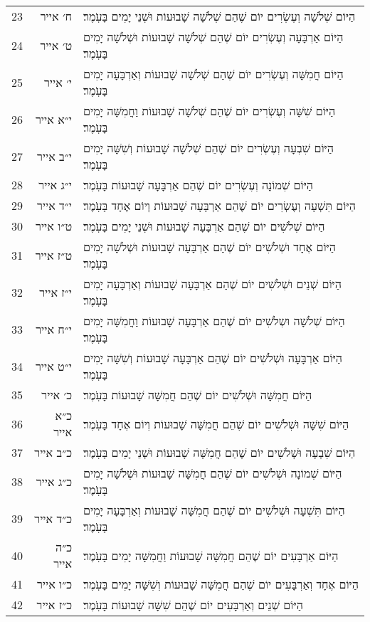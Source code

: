 \documentclass[twoside, openany, parskip=half, 11pt]{book}
\begin{document}
\begin{scriptsize}
\begin{longtable}{ l | r | p{} }
23 & ח׳ אייר & הַיּוֹם שְׁלֹשָׁה וְעֶשְׂרִים יוֹם שֶׁהֵם שְׁלֹשָׁה שָׁבוּעוֹת וּשְׁנֵי יָמִים בָּעֹֽמֶר׃ \\
24 & ט׳ אייר & הַיּוֹם אַרְבָּעָה וְעֶשְׂרִים יוֹם שֶׁהֵם שְׁלֹשָׁה שָׁבוּעוֹת וּשְׁלֹשָׁה יָמִים בָּעֹֽמֶר׃ \\
25 & י׳ אייר & הַיּוֹם חֲמִשָּׁה וְעֶשְׂרִים יוֹם שֶׁהֵם שְׁלֹשָׁה שָׁבוּעוֹת וְאַרְבָּעָה יָמִים בָּעֹֽמֶר׃ \\
26 & י״א אייר & הַיּוֹם שִׁשָּׁה וְעֶשְׂרִים יוֹם שֶׁהֵם שְׁלֹשָׁה שָׁבוּעוֹת וַחֲמִשָּׁה יָמִים בָּעֹֽמֶר׃ \\
27 & י״ב אייר & הַיּוֹם שִׁבְעָה וְעֶשְׂרִים יוֹם שֶׁהֵם שְׁלֹשָׁה שָׁבוּעוֹת וְשִׁשָּׁה יָמִים בָּעֹֽמֶר׃ \\
28 & י״ג אייר & הַיּוֹם שְׁמוֹנָה וְעֶשְׂרִים יוֹם שֶׁהֵם אַרְבָּעָה שָׁבוּעוֹת בָּעֹֽמֶר׃ \\
29 & י״ד אייר & הַיּוֹם תִּשְׁעָה וְעֶשְׂרִים יוֹם שֶׁהֵם אַרְבָּעָה שָׁבוּעוֹת וְיוֹם אֶחָד בָּעֹֽמֶר׃ \\
30 & ט״ו אייר & הַיּוֹם שְׁלֹשִׁים יוֹם שֶׁהֵם אַרְבָּעָה שָׁבוּעוֹת וּשְׁנֵי יָמִים בָּעֹֽמֶר׃ \\
31 & ט״ז אייר & הַיּוֹם אֶחָד וּשְׁלֹשִׁים יוֹם שֶׁהֵם אַרְבָּעָה שָׁבוּעוֹת וּשְׁלֹשָׁה יָמִים בָּעֹֽמֶר׃ \\
32 & י״ז אייר & הַיּוֹם שְׁנֵים וּשְׁלֹשִׁים יוֹם שֶׁהֵם אַרְבָּעָה שָׁבוּעוֹת וְאַרְבָּעָה יָמִים בָּעֹֽמֶר׃ \\
33 & י״ח אייר & הַיּוֹם שְׁלֹשָׁה וּשְלֹשִׁים יוֹם שֶׁהֵם אַרְבָּעָה שָׁבוּעוֹת וַחֲמִשָּׁה יָמִים בָּעֹֽמֶר׃ \\
34 & י״ט אייר & הַיּוֹם אַרְבָּעָה וּשְׁלֹשִׁים יוֹם שֶׁהֵם אַרְבָּעָה שָׁבוּעוֹת וְשִׁשָּׁה יָמִים בָּעֹֽמֶר׃ \\
35 & כ׳ אייר & הַיּוֹם חֲמִשָּׁה וּשְׁלֹשִׁים יוֹם שֶׁהֵם חֲמִשָּׁה שָׁבוּעוֹת בָּעֹֽמֶר׃ \\
36 & כ״א אייר & הַיּוֹם שִׁשָּׁה וּשְׁלֹשִׁים יוֹם שֶׁהֵם חֲמִשָּׁה שָׁבוּעוֹת וְיוֹם אֶחָד בָּעֹֽמֶר׃ \\
37 & כ״ב אייר & הַיּוֹם שִׁבְעָה וּשְׁלֹשִׁים יוֹם שֶׁהֵם חֲמִשָּׁה שָׁבוּעוֹת וּשְׁנֵי יָמִים בָּעֹֽמֶר׃ \\
38 & כ״ג אייר & הַיּוֹם שְׁמוֹנָה וּשְׁלֹשִׁים יוֹם שֶׁהֵם חֲמִשָּׁה שָׁבוּעוֹת וּשְׁלֹשָׁה יָמִים בָּעֹֽמֶר׃ \\
39 & כ״ד אייר & הַיּוֹם תִּשְׁעָה וּשְׁלֹשִׁים יוֹם שֶׁהֵם חֲמִשָּׁה שָׁבוּעוֹת וְאַרְבָּעָה יָמִים בָּעֹֽמֶר׃ \\
40 & כ״ה אייר & הַיּוֹם אַרְבָּעִים יוֹם שֶׁהֵם חֲמִשָּׁה שָׁבוּעוֹת וַחֲמִשָּׁה יָמִים בָּעֹֽמֶר׃ \\
41 & כ״ו אייר & הַיּוֹם אֶחָד וְאַרְבָּעִים יוֹם שֶׁהֵם חֲמִשָּׁה שָׁבוּעוֹת וְשִׁשָּׁה יָמִים בָּעֹֽמֶר׃ \\
42 & כ״ז אייר & הַיּוֹם שְׁנֵים וְאַרְבָּעִים יוֹם שֶׁהֵם שִׁשָּׁה שָׁבוּעוֹת בָּעֹֽמֶר׃ \\

\end{longtable}
\end{scriptsize}
\end{document}
